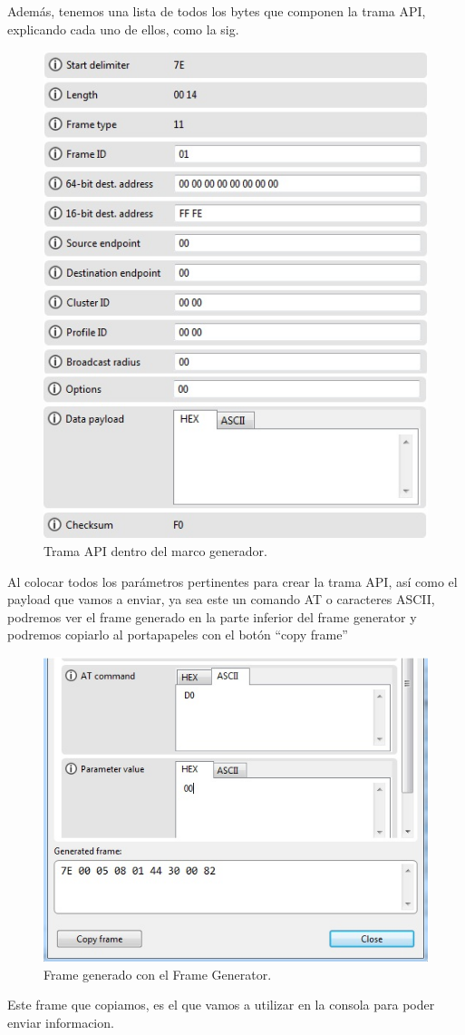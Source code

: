 \documentclass[11pt,oneside,spanish,a4paper]{article}
\begin{document}
	Además, tenemos una lista de todos los bytes que componen la trama API, explicando cada uno de ellos, como la sig.
\begin{figure}[ht]
		\centering
		\includegraphics[width=.6\textwidth]{img/IMAGEN10.jpg}
		\caption{Trama API dentro del marco generador.}
\end{figure}
Al colocar todos los parámetros pertinentes para crear la trama API, así como el payload que vamos a enviar, ya sea este un comando AT o caracteres ASCII, podremos ver el frame generado en la parte inferior del frame generator y podremos copiarlo al portapapeles con el botón “copy frame”
\begin{figure}[ht]
	\centering
	\includegraphics[width=.6\textwidth]{img/IMAGEN11.jpg}
	\caption{Frame generado con el Frame Generator.}
\end{figure}
Este frame que copiamos, es el que vamos a utilizar en la consola para poder enviar informacion.
\end{document}

